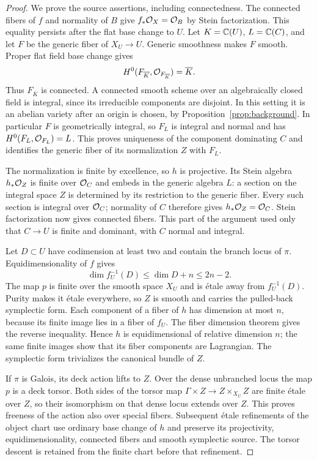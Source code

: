 \begin{proof}
We prove the source assertions, including connectedness.  The connected
fibers of $f$ and normality of $B$ give $f_*\mathcal O_X=\mathcal O_B$ by Stein
factorization.  This equality persists after the flat base change to
$U$.  Let $K=\mathbb C(U)$, $L=\mathbb C(C)$, and let $F$ be the generic fiber of
$X_U\to U$.  Generic smoothness makes $F$ smooth.  Proper flat field
base change gives
\[
 H^0(F_{\overline K},\mathcal O_{F_{\overline K}})=\overline K.
\]
Thus $F_{\overline K}$ is connected.  A connected smooth scheme over
an algebraically closed field is integral, since its irreducible
components are disjoint.  In this setting it is an abelian variety
after an origin is chosen, by Proposition~\ref{prop:background}.
In particular $F$ is geometrically integral, so $F_L$ is integral
and normal and has $H^0(F_L,\mathcal O_{F_L})=L$.  This proves uniqueness of
the component dominating $C$ and identifies the generic fiber of its
normalization $Z$ with $F_L$.

The normalization is finite by excellence, so $h$ is projective.
Its Stein algebra $h_*\mathcal O_Z$ is finite over $\mathcal O_C$ and embeds in the
generic algebra $L$: a section on the integral space $Z$ is determined
by its restriction to the generic fiber.  Every such section is
integral over $\mathcal O_C$; normality of $C$ therefore gives
$h_*\mathcal O_Z=\mathcal O_C$.  Stein factorization now gives connected fibers.
This part of the argument used only that $C\to U$ is finite and
dominant, with $C$ normal and integral.

Let $D\subset U$ have codimension at least two and contain the branch
locus of $\pi$.  Equidimensionality of $f$ gives
\[
 \dim f_U^{-1}(D)\leq\dim D+n\leq2n-2.
\]
The map $p$ is finite over the smooth space $X_U$ and is \'etale away
from $f_U^{-1}(D)$.  Purity makes it \'etale everywhere, so $Z$ is
smooth and carries the pulled-back symplectic form.  Each component of
a fiber of $h$ has dimension at most $n$, because its finite image lies
in a fiber of $f_U$.  The fiber dimension theorem gives the reverse
inequality.  Hence $h$ is equidimensional of relative dimension $n$;
the same finite images show that its fiber components are Lagrangian.
The symplectic form trivializes the canonical bundle of $Z$.

If $\pi$ is Galois, its deck action lifts to $Z$.  Over the dense
unbranched locus the map $p$ is a deck torsor.  Both sides of the torsor
map $\Gamma\times Z\to Z\times_{X_U}Z$ are finite \'etale over $Z$,
so their isomorphism on that dense locus extends over $Z$.  This proves
freeness of the action also over special fibers.  Subsequent \'etale
refinements of the object chart use ordinary base change of $h$ and
preserve its projectivity, equidimensionality, connected fibers and
smooth symplectic source.  The torsor descent is retained from the
finite chart before that refinement.
\end{proof}


